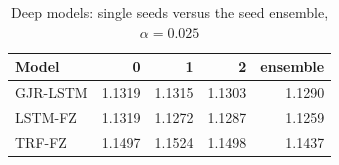 \begin{table}[htbp]
\centering
\footnotesize
\caption{Deep models: single seeds versus the seed ensemble, $\alpha=0.025$}
\label{tab:seeds}
\begin{tabular}{lrrrr}
\toprule
Model & 0 & 1 & 2 & ensemble \\
\midrule
GJR-LSTM & 1.1319 & 1.1315 & 1.1303 & 1.1290 \\
LSTM-FZ & 1.1319 & 1.1272 & 1.1287 & 1.1259 \\
TRF-FZ & 1.1497 & 1.1524 & 1.1498 & 1.1437 \\
\bottomrule
\end{tabular}
\end{table}